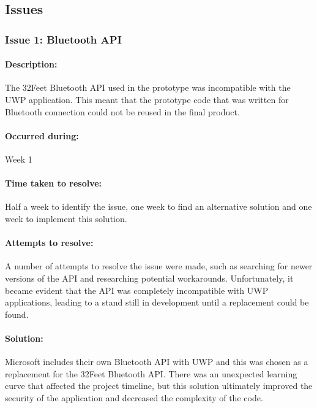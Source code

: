 	\subsection{Issues}
		\subsubsection{Issue 1: Bluetooth API}{
			\paragraph{Description:}
			The 32Feet Bluetooth API used in the prototype was incompatible with the UWP application. This meant that the prototype code that was written for Bluetooth connection could not be reused in the final product.
				
			\paragraph{Occurred during:}
			Week 1
		
			\paragraph{Time taken to resolve:} Half a week to identify the issue, one week to find an alternative solution and one week to implement this solution.
		
			\paragraph{Attempts to resolve:}
			A number of attempts to resolve the issue were made, such as searching for newer versions of the API and researching potential workarounds. Unfortunately, it became evident that the API was completely incompatible with UWP applications, leading to a stand still in development until a replacement could be found.
			
			\paragraph{Solution:}
			Microsoft includes their own Bluetooth API with UWP and this was chosen as a replacement for the 32Feet Bluetooth API. There was an unexpected learning curve that affected the project timeline, but this solution ultimately improved the security of the application and decreased the complexity of the code.
		}
		\label{ssec:BluetoothAPI}
		
